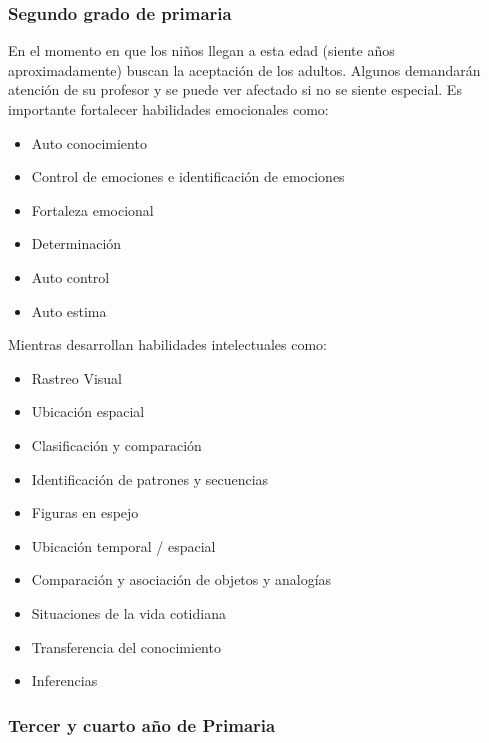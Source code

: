 \documentclass[letterpaper,10pt]{article}
\begin{document}
\subsubsection{Segundo grado de primaria}

En el momento en que los niños llegan a esta edad (siente años aproximadamente) 
buscan la aceptación de los adultos.  Algunos 
demandarán atención de su profesor y se puede ver afectado si no se siente especial. 
Es importante fortalecer habilidades emocionales como:
\begin{itemize}
	\item Auto conocimiento
	\item Control de emociones e identificación de emociones
	\item Fortaleza emocional
	\item Determinación
	\item Auto control
	\item Auto estima
\end{itemize}
Mientras desarrollan habilidades intelectuales como:
\begin{itemize}
	\item Rastreo Visual
	\item Ubicación espacial
	\item Clasificación y comparación
	\item Identificación de patrones y secuencias
	\item Figuras en espejo
	\item Ubicación temporal / espacial
	\item Comparación y asociación de objetos y analogías
	\item Situaciones de la vida cotidiana
	\item Transferencia del conocimiento
	\item Inferencias

\end{itemize}
\subsubsection{Tercer y cuarto año de Primaria}
\end{document}
